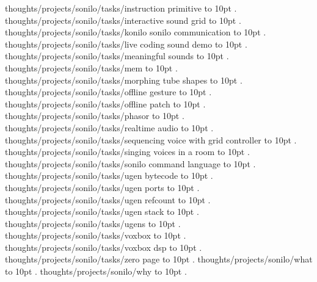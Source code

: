 \smallskip
thoughts/projects/sonilo/tasks/instruction primitive \leaders\hbox to 10pt {\hss.\hss}  \hfill {}
\smallskip
thoughts/projects/sonilo/tasks/interactive sound grid \leaders\hbox to 10pt {\hss.\hss}  \hfill {}
\smallskip
thoughts/projects/sonilo/tasks/konilo sonilo communication \leaders\hbox to 10pt {\hss.\hss}  \hfill {}
\smallskip
thoughts/projects/sonilo/tasks/live coding sound demo \leaders\hbox to 10pt {\hss.\hss}  \hfill {}
\smallskip
thoughts/projects/sonilo/tasks/meaningful sounds \leaders\hbox to 10pt {\hss.\hss}  \hfill {}
\smallskip
thoughts/projects/sonilo/tasks/mem \leaders\hbox to 10pt {\hss.\hss}  \hfill {}
\smallskip
thoughts/projects/sonilo/tasks/morphing tube shapes \leaders\hbox to 10pt {\hss.\hss}  \hfill {}
\smallskip
thoughts/projects/sonilo/tasks/offline gesture \leaders\hbox to 10pt {\hss.\hss}  \hfill {}
\smallskip
thoughts/projects/sonilo/tasks/offline patch \leaders\hbox to 10pt {\hss.\hss}  \hfill {}
\smallskip
thoughts/projects/sonilo/tasks/phasor \leaders\hbox to 10pt {\hss.\hss}  \hfill {}
\smallskip
thoughts/projects/sonilo/tasks/realtime audio \leaders\hbox to 10pt {\hss.\hss}  \hfill {}
\smallskip
thoughts/projects/sonilo/tasks/sequencing voice with grid controller \leaders\hbox to 10pt {\hss.\hss}  \hfill {}
\smallskip
thoughts/projects/sonilo/tasks/singing voices in a room \leaders\hbox to 10pt {\hss.\hss}  \hfill {}
\smallskip
thoughts/projects/sonilo/tasks/sonilo command language \leaders\hbox to 10pt {\hss.\hss}  \hfill {}
\smallskip
thoughts/projects/sonilo/tasks/ugen bytecode \leaders\hbox to 10pt {\hss.\hss}  \hfill {}
\smallskip
thoughts/projects/sonilo/tasks/ugen ports \leaders\hbox to 10pt {\hss.\hss}  \hfill {}
\smallskip
thoughts/projects/sonilo/tasks/ugen refcount \leaders\hbox to 10pt {\hss.\hss}  \hfill {}
\smallskip
thoughts/projects/sonilo/tasks/ugen stack \leaders\hbox to 10pt {\hss.\hss}  \hfill {}
\smallskip
thoughts/projects/sonilo/tasks/ugens \leaders\hbox to 10pt {\hss.\hss}  \hfill {}
\smallskip
thoughts/projects/sonilo/tasks/voxbox \leaders\hbox to 10pt {\hss.\hss}  \hfill {}
\smallskip
thoughts/projects/sonilo/tasks/voxbox dsp \leaders\hbox to 10pt {\hss.\hss}  \hfill {}
\smallskip
thoughts/projects/sonilo/tasks/zero page \leaders\hbox to 10pt {\hss.\hss}  \hfill {}
\smallskip
thoughts/projects/sonilo/what \leaders\hbox to 10pt {\hss.\hss}  \hfill {}
\smallskip
thoughts/projects/sonilo/why \leaders\hbox to 10pt {\hss.\hss}  \hfill {}
